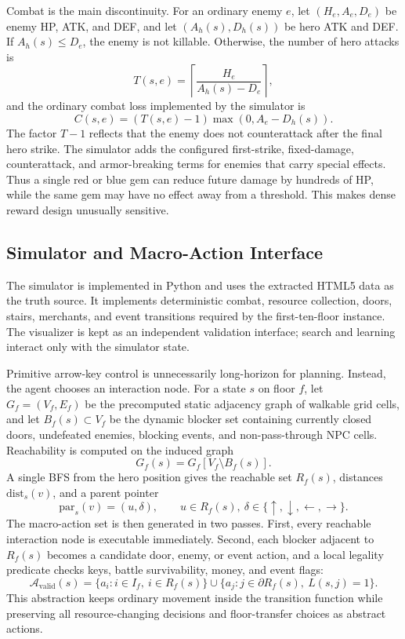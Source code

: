 \documentclass{article}
\begin{document}
Combat is the main discontinuity.  For an ordinary enemy \(e\), let
\((H_e,A_e,D_e)\) be enemy HP, ATK, and DEF, and let
\((A_h(s),D_h(s))\) be hero ATK and DEF.  If \(A_h(s)\le D_e\), the enemy is
not killable.  Otherwise, the number of hero attacks is
\[
  T(s,e)=
  \left\lceil \frac{H_e}{A_h(s)-D_e} \right\rceil,
\]
and the ordinary combat loss implemented by the simulator is
\[
  C(s,e) =
  (T(s,e)-1)\max(0,A_e-D_h(s)).
\]
The factor \(T-1\) reflects that the enemy does not counterattack after the
final hero strike.  The simulator adds the configured first-strike, fixed-damage,
counterattack, and armor-breaking terms for enemies that carry special effects.
Thus a single red or blue gem can reduce future damage by hundreds of HP, while
the same gem may have no effect away from a threshold.  This makes dense reward
design unusually sensitive.

\subsection{Simulator and Macro-Action Interface}
\label{subsec:macro_action}
The simulator is implemented in Python and uses the extracted HTML5 data as the
truth source.  It implements deterministic combat, resource collection, doors,
stairs, merchants, and event transitions required by the first-ten-floor
instance.  The visualizer is kept as an independent validation interface; search
and learning interact only with the simulator state.

Primitive arrow-key control is unnecessarily long-horizon for planning.
Instead, the agent chooses an interaction node.  For a state \(s\) on floor
\(f\), let \(G_f=(V_f,E_f)\) be the precomputed static adjacency graph of
walkable grid cells, and let \(B_f(s)\subset V_f\) be the dynamic blocker set
containing currently closed doors, undefeated enemies, blocking events, and
non-pass-through NPC cells.  Reachability is computed on the induced graph
\[
  G_f(s)=G_f[V_f\setminus B_f(s)].
\]
A single BFS from the hero position gives the reachable set \(R_f(s)\), distances
\(\mathrm{dist}_s(v)\), and a parent pointer
\[
  \mathrm{par}_s(v)=(u,\delta),\qquad u\in R_f(s),\ \delta\in\{\uparrow,\downarrow,\leftarrow,\rightarrow\}.
\]
The macro-action set is then generated in two passes.  First, every reachable
interaction node is executable immediately.  Second, each blocker adjacent to
\(R_f(s)\) becomes a candidate door, enemy, or event action, and a local legality
predicate checks keys, battle survivability, money, and event flags:
\[
  \mathcal A_{\mathrm{valid}}(s)
  =
  \{a_i:i\in I_f,\ i\in R_f(s)\}
  \cup
  \{a_j:j\in \partial R_f(s),\ L(s,j)=1\}.
\]
This abstraction keeps ordinary movement inside the transition function while
preserving all resource-changing decisions and floor-transfer choices as
abstract actions.
\end{document}
